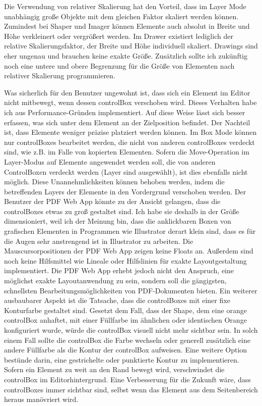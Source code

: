 \par
Die Verwendung von relativer Skalierung hat den Vorteil, dass im Layer Mode unabhängig große Objekte mit dem gleichen Faktor skaliert werden können. Zumindest bei Shaper und Imager können Elemente auch absolut in Breite und Höhe verkleinert oder vergrößert werden. Im Drawer existiert lediglich der relative Skalierungsfaktor, der Breite und Höhe individuell skaliert. Drawings sind eher ungenau und brauchen keine exakte Größe. Zusätzlich sollte ich zukünftig noch eine untere und obere Begrenzung für die Größe von Elementen nach relativer Skalierung programmieren. 
\par
Was sicherlich für den Benutzer ungewohnt ist, dass sich ein Element im Editor nicht mitbewegt, wenn dessen controlBox verschoben wird. Dieses Verhalten habe ich aus Performance-Gründen implementiert. Auf diese Weise lässt sich besser erfassen, was sich unter dem Element an der Zielposition befindet. Der Nachteil ist, dass Elemente weniger präzise platziert werden können. Im Box Mode können nur controlBoxes bearbeitet werden, die nicht von anderen controlBoxes verdeckt sind, wie z.B. im Falle von kopierten Elementen. Sofern die Move-Operation im Layer-Modus auf Elemente angewendet werden soll, die von anderen ControlBoxen verdeckt werden (Layer sind ausgewählt), ist dies ebenfalls nicht möglich. Diese Unannehmlichkeiten können behoben werden, indem die betreffenden Layers der Elemente in den Vordergrund verschoben werden. Der Benutzer der PDF Web App könnte zu der Ansicht gelangen, dass die controlBoxes etwas zu groß gestaltet sind. Ich habe sie deshalb in der Größe dimensioniert, weil ich der Meinung bin, dass die anklickbaren Boxen von grafischen Elementen in Programmen wie Illustrator derart klein sind, dass es für die Augen sehr anstrengend ist in Illustrator zu arbeiten. Die Mauscursorpositionen der PDF Web App zeigen keine Floats an. Außerdem sind noch keine Hilfsmittel wie Lineale oder Hilfslinien für exakte Layoutgestaltung implementiert. Die PDF Web App erhebt jedoch nicht den Anspruch, eine möglichst exakte Layoutanwendung zu sein, sondern soll die gängigsten, schnellsten Bearbeitungsmöglichkeiten von PDF-Dokumenten bieten. Ein weiterer ausbaubarer Aspekt ist die Tatsache, dass die controlBoxes mit einer fixe Konturfarbe gestaltet sind. Gesetzt dem Fall, dass der Shape, dem eine orange controlBox anhaftet, mit einer Füllfarbe im ähnlichen oder identischen Orange konfiguriert wurde, würde die controlBox visuell nicht mehr sichtbar sein. In solch einem Fall sollte die controlBox die Farbe wechseln oder generell zusätzlich eine andere Füllfarbe als die Kontur der controlBox aufweisen. Eine weitere Option bestünde darin, eine gestrichelte oder punktierte Kontur zu implementieren. Sofern ein Element zu weit an den Rand bewegt wird, verschwindet die controlBox im Editorhintergrund. Eine Verbesserung für die Zukunft wäre, dass controlBoxes immer sichtbar sind, selbst wenn das Element aus dem Seitenbereich heraus manövriert wird.
